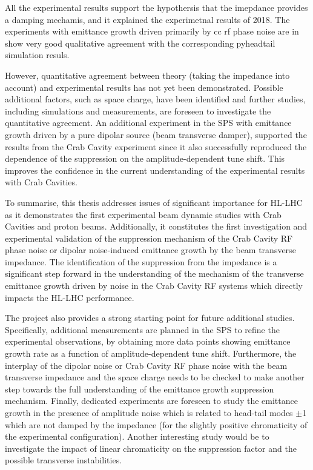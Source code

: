 All the experimental results support the hypothersis that the imepdance provides a damping mechamis, and it explained the experimetnal results of 2018. The experiments with emittance growth driven primarily by cc rf phase noise are in show very good qualitative agreement with the corresponding pyheadtail simulation resuls.

However, quantitative agreement between theory (taking the impedance into account) and experimental results has not yet been demonstrated. Possible additional factors, such as space charge, have been identified and further studies, including simulations and measurements, are foreseen to investigate the quantitative agreement. An additional experiment in the SPS with emittance growth driven by a pure dipolar source (beam transverse damper), supported the results from the Crab Cavity experiment since it also successfully reproduced the dependence of the suppression on the amplitude-dependent tune shift. This improves the confidence in the current understanding of the experimental results with Crab Cavities.

To summarise, this thesis addresses issues of significant importance for HL-LHC as it demonstrates the first experimental beam dynamic studies with Crab Cavities and proton beams. Additionally, it constitutes the first investigation and experimental validation of the suppression mechanism of the Crab Cavity RF phase noise or dipolar noise-induced emittance growth by the beam transverse impedance. The identification of the suppression from the impedance is a significant step forward in the understanding of the mechanism of the transverse emittance growth driven by noise in the Crab Cavity RF systems which directly impacts the HL-LHC performance.

The project also provides a strong starting point for future additional studies.
Specifically, additional measurements are planned in the SPS to refine the experimental observations, by obtaining more data points showing emittance growth rate as a function of amplitude-dependent tune shift. Furthermore, the interplay of the dipolar noise or Crab Cavity RF phase noise with the beam transverse impedance and the space charge needs to be checked to make another step towards the full understanding of the emittance growth suppression mechanism. Finally, dedicated experiments are foreseen to study the emittance growth in the presence of amplitude noise which is related to head-tail modes $\pm$1 which are not damped by the impedance (for the slightly positive chromaticity of the experimental configuration). Another interesting study would be to investigate the impact of linear chromaticity on the suppression factor and the possible transverse instabilities.

